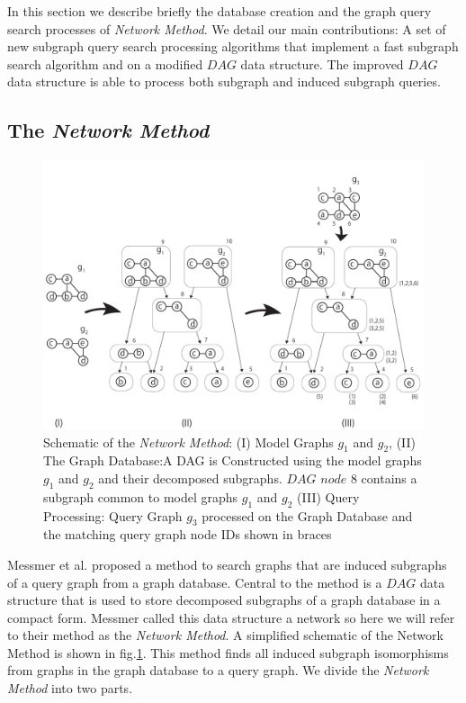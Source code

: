 In this section we describe briefly the database creation and the graph query search processes of  \textit{Network Method}. We detail our main contributions: A set of new subgraph query search processing algorithms that implement a fast subgraph search algorithm and on a modified $DAG$ data structure. The improved $DAG$ data structure is able to process both subgraph and induced subgraph queries.

\subsection{The \textit{Network Method}}
 

\begin{figure}
\centering
\includegraphics[width=1.0\textwidth]{dag_construction_query_processing6.pdf}
\caption{Schematic of the \textit{Network Method}: (I) Model Graphs $g_1$ and $g_2$, (II) The Graph Database:A DAG is Constructed using  the model graphs $g_1$ and $g_2$ and their decomposed subgraphs. $DAG$ $node$ $8$ contains a subgraph common to model graphs $g_1$ and $g_2$  (III) Query Processing: Query Graph $g_3$ processed on the Graph Database and the matching query graph node IDs shown in braces}
\label{fig:fig2}
\end{figure}


Messmer et al.\cite{messmer_bunke2000} proposed a method to search graphs that are induced subgraphs of a query graph from a graph database. 
Central to the method is a $DAG$ data structure that is used to store decomposed subgraphs of a graph database in a compact form. 
Messmer called this data structure a network so here we will refer to their method as the \textit{Network Method}. 
A simplified schematic of the Network Method is shown in fig.\ref{fig:fig2}. 
This method finds all induced subgraph isomorphisms from graphs in the graph database to a query graph.
We divide the \textit{Network Method} into two parts.

